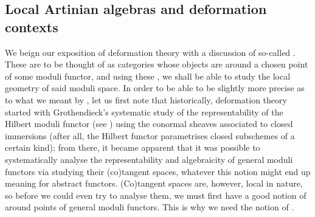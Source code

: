     \subsection{Local Artinian algebras and deformation contexts}
        We beign our exposition of deformation theory with a discussion of so-called . These are to be thought of as categories whose objects are  around a chosen point of some moduli functor, and using these , we shall be able to study the local geometry of said moduli space. In order to be able to be slightly more precise as to what we meant by , let us first note that historically, deformation theory started with Grothendieck's systematic study of the representability of the Hilbert moduli functor (see \cite{grothendieck_fga_2}) using the conormal sheaves associated to closed immersions (after all, the Hilbert functor parametrises closed subschemes of a certain kind); from there, it became apparent that it was possible to systematically analyse the representability and algebraicity of general moduli functors via studying their (co)tangent spaces, whatever this notion might end up meaning for abstract functors. (Co)tangent spaces are, however, local in nature, so before we could even try to analyse them, we must first have a good notion of  around points of general moduli functors. This is why we need the notion of .
        
